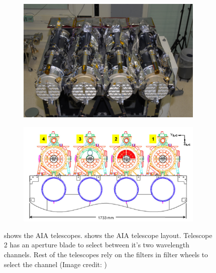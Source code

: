 \begin{figure}[h!]
    \begin{subfigure}[b]{0.5\textwidth}
        \centering
        \includegraphics[width=\textwidth]{images/SDO AIA Telescopes.jpg}
        \caption{ }
        \label{fig:aia_telescopes}
    \end{subfigure}
    \hfill
    \begin{subfigure}[b]{0.5\textwidth}
        \centering
        \includegraphics[width=\textwidth]{images/AIA_telescope_layout.png}
        \caption{ }
        {\label{fig:aia_telescope_layout}}
    \end{subfigure}
    \label{fig:aia_telescope_and_layout}
    \caption[AIA telescope and it's Layout]{ shows the AIA telescopes.  shows the AIA telescope layout. Telescope 2 has an aperture blade to select between it's two wavelength channels. Rest of the telescopes rely on the filters in filter wheels to select the channel (Image credit: )}
\end{figure}


